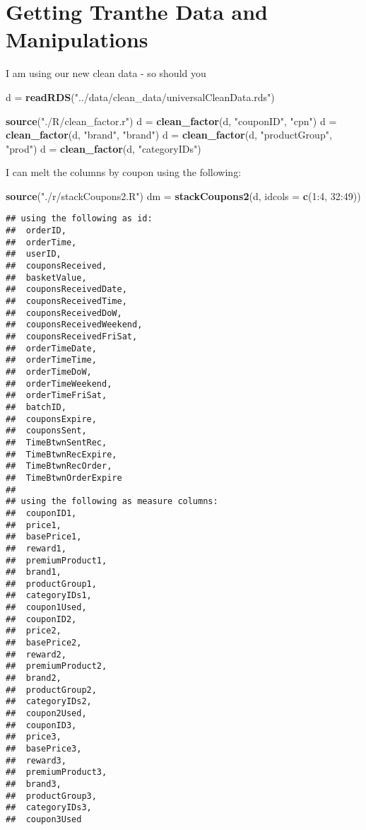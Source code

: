 \documentclass[10pt]{report}
\newenvironment{Shaded}{}{}
\newcommand{\KeywordTok}[1]{\textcolor[rgb]{0.00,0.44,0.13}{\textbf{{#1}}}}
\newcommand{\DataTypeTok}[1]{\textcolor[rgb]{0.56,0.13,0.00}{{#1}}}
\newcommand{\DecValTok}[1]{\textcolor[rgb]{0.25,0.63,0.44}{{#1}}}
\newcommand{\StringTok}[1]{\textcolor[rgb]{0.25,0.44,0.63}{{#1}}}
\newcommand{\NormalTok}[1]{{#1}}
\begin{document}
\section{Getting Tranthe Data and
Manipulations}\label{getting-tranthe-data-and-manipulations}

I am using our new clean data - so should you

\begin{Shaded}
\begin{Highlighting}[]
\NormalTok{d =}\StringTok{ }\KeywordTok{readRDS}\NormalTok{(}\StringTok{"../data/clean_data/universalCleanData.rds"}\NormalTok{)}

\KeywordTok{source}\NormalTok{(}\StringTok{"./R/clean_factor.r"}\NormalTok{)}
\NormalTok{d =}\StringTok{ }\KeywordTok{clean_factor}\NormalTok{(d, }\StringTok{"couponID"}\NormalTok{, }\StringTok{"cpn"}\NormalTok{)}
\NormalTok{d =}\StringTok{ }\KeywordTok{clean_factor}\NormalTok{(d, }\StringTok{"brand"}\NormalTok{, }\StringTok{"brand"}\NormalTok{)}
\NormalTok{d =}\StringTok{ }\KeywordTok{clean_factor}\NormalTok{(d, }\StringTok{"productGroup"}\NormalTok{, }\StringTok{"prod"}\NormalTok{)}
\NormalTok{d =}\StringTok{ }\KeywordTok{clean_factor}\NormalTok{(d, }\StringTok{"categoryIDs"}\NormalTok{)}
\end{Highlighting}
\end{Shaded}

I can melt the columns by coupon using the following:

\begin{Shaded}
\begin{Highlighting}[]
\KeywordTok{source}\NormalTok{(}\StringTok{"./r/stackCoupons2.R"}\NormalTok{)}
\NormalTok{dm =}\StringTok{ }\KeywordTok{stackCoupons2}\NormalTok{(d, }\DataTypeTok{idcols =} \KeywordTok{c}\NormalTok{(}\DecValTok{1}\NormalTok{:}\DecValTok{4}\NormalTok{, }\DecValTok{32}\NormalTok{:}\DecValTok{49}\NormalTok{))}
\end{Highlighting}
\end{Shaded}

\begin{verbatim}
## using the following as id:
##  orderID,
##  orderTime,
##  userID,
##  couponsReceived,
##  basketValue,
##  couponsReceivedDate,
##  couponsReceivedTime,
##  couponsReceivedDoW,
##  couponsReceivedWeekend,
##  couponsReceivedFriSat,
##  orderTimeDate,
##  orderTimeTime,
##  orderTimeDoW,
##  orderTimeWeekend,
##  orderTimeFriSat,
##  batchID,
##  couponsExpire,
##  couponsSent,
##  TimeBtwnSentRec,
##  TimeBtwnRecExpire,
##  TimeBtwnRecOrder,
##  TimeBtwnOrderExpire
## 
## using the following as measure columns:
##  couponID1,
##  price1,
##  basePrice1,
##  reward1,
##  premiumProduct1,
##  brand1,
##  productGroup1,
##  categoryIDs1,
##  coupon1Used,
##  couponID2,
##  price2,
##  basePrice2,
##  reward2,
##  premiumProduct2,
##  brand2,
##  productGroup2,
##  categoryIDs2,
##  coupon2Used,
##  couponID3,
##  price3,
##  basePrice3,
##  reward3,
##  premiumProduct3,
##  brand3,
##  productGroup3,
##  categoryIDs3,
##  coupon3Used
\end{verbatim}
\end{document}
